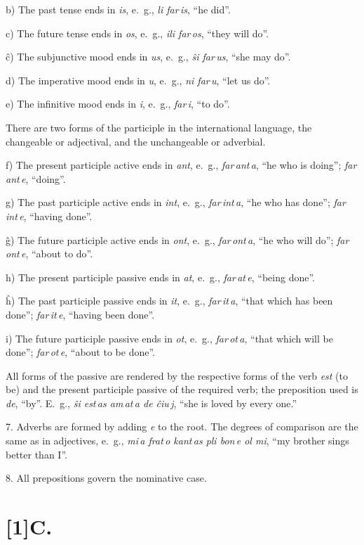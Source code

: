 \documentclass[12pt,twoside]{book}
\begin{document}
b) The past tense ends in \emph{is}, e.~g., \emph{li far\,is}, “he did”.

c) The future tense ends in \emph{os}, e.~g., \emph{ili far\,os}, “they will do”.

ĉ) The subjunctive mood ends in \emph{us}, e.~g., \emph{ŝi far\,us}, “she may do”.

d) The imperative mood ends in \emph{u}, e.~g., \emph{ni far\,u}, “let us do”.

e) The infinitive mood ends in \emph{i}, e.~g., \emph{far\,i}, “to do”.

There are two forms of the participle in the international language, the changeable or adjectival, and the unchangeable or adverbial. 

f) The present participle active ends in \emph{ant}, e.~g., \emph{far\,ant\,a}, “he who is doing”; \emph{far\,ant\,e}, “doing”.

g) The past participle active ends in \emph{int}, e.~g., \emph{far\,int\,a}, “he who has done”; \emph{far\,int\,e}, “having done”.

ĝ) The future participle active ends in \emph{ont}, e.~g., \emph{far\,ont\,a}, “he who will do”; \emph{far\,ont\,e}, “about to do”.

h) The present participle passive ends in \emph{at}, e.~g., \emph{far\,at\,e}, “being done”.

ĥ) The past participle passive ends in \emph{it}, e.~g., \emph{far\,it\,a}, “that which has been done”; \emph{far\,it\,e}, “having been done”.

i) The future participle passive ends in \emph{ot}, e.~g., \emph{far\,ot\,a}, “that which will be done”; \emph{far\,ot\,e}, “about to be done”.

All forms of the passive are rendered by the respective forms of the verb \emph{est} (to be) and the present participle passive of the required verb; the preposition used is \emph{de}, “by”. E.~g., \emph{ŝi est\,as am\,at\,a de ĉiu\,j}, “she is loved by every one.”

7. Adverbs are formed by adding \emph{e} to the root. The degrees of comparison are the same as in adjectives, e.~g., \emph{mi\,a frat\,o kant\,as pli bon\,e ol mi}, “my brother sings better than I”.

8. All prepositions govern the nominative case.

\section*{\scalebox{0.8}[1]C. \hspace{.2em} }
\end{document}
